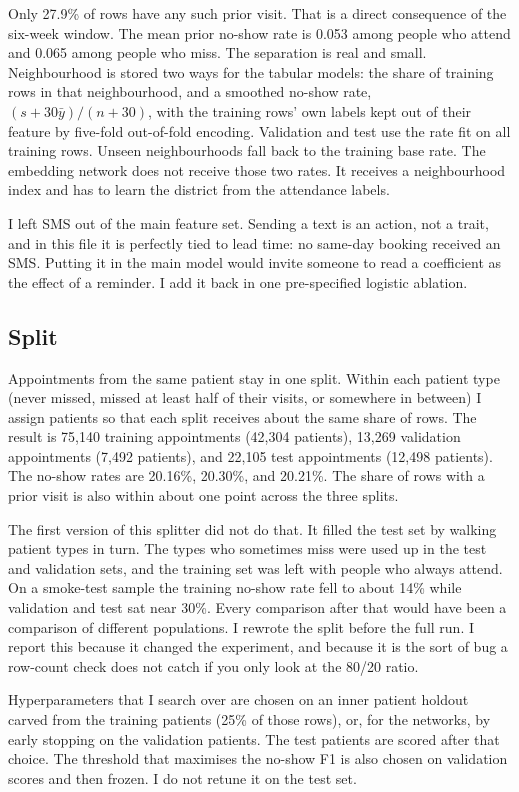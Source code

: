 \documentclass[conference]{IEEEtran}
\begin{document}
Only 27.9\% of rows have any such prior visit. That is a direct consequence of the six-week window. The mean prior no-show rate is 0.053 among people who attend and 0.065 among people who miss. The separation is real and small. Neighbourhood is stored two ways for the tabular models: the share of training rows in that neighbourhood, and a smoothed no-show rate, $(s + 30\bar{y})/(n+30)$, with the training rows' own labels kept out of their feature by five-fold out-of-fold encoding. Validation and test use the rate fit on all training rows. Unseen neighbourhoods fall back to the training base rate. The embedding network does not receive those two rates. It receives a neighbourhood index and has to learn the district from the attendance labels.

I left SMS out of the main feature set. Sending a text is an action, not a trait, and in this file it is perfectly tied to lead time: no same-day booking received an SMS. Putting it in the main model would invite someone to read a coefficient as the effect of a reminder. I add it back in one pre-specified logistic ablation.

\subsection{Split}
Appointments from the same patient stay in one split. Within each patient type (never missed, missed at least half of their visits, or somewhere in between) I assign patients so that each split receives about the same share of rows. The result is 75,140 training appointments (42,304 patients), 13,269 validation appointments (7,492 patients), and 22,105 test appointments (12,498 patients). The no-show rates are 20.16\%, 20.30\%, and 20.21\%. The share of rows with a prior visit is also within about one point across the three splits.

The first version of this splitter did not do that. It filled the test set by walking patient types in turn. The types who sometimes miss were used up in the test and validation sets, and the training set was left with people who always attend. On a smoke-test sample the training no-show rate fell to about 14\% while validation and test sat near 30\%. Every comparison after that would have been a comparison of different populations. I rewrote the split before the full run. I report this because it changed the experiment, and because it is the sort of bug a row-count check does not catch if you only look at the 80/20 ratio.

Hyperparameters that I search over are chosen on an inner patient holdout carved from the training patients (25\% of those rows), or, for the networks, by early stopping on the validation patients. The test patients are scored after that choice. The threshold that maximises the no-show F1 is also chosen on validation scores and then frozen. I do not retune it on the test set.
\end{document}
